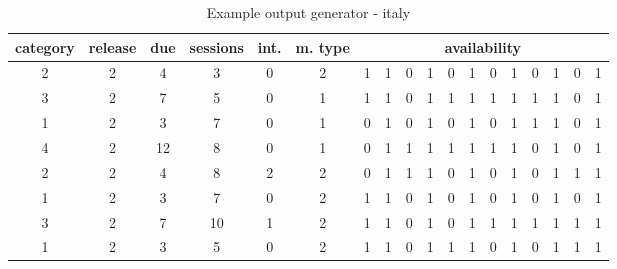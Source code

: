  \begin{table}[h]
\begin{tabular}{|c|c|c|c|c|c|c|c|c|c|c|c|c|c|c|c|c|c|}
\hline
category & release & due & sessions & int. & m. type & \multicolumn{12}{c|}{availability}            \\ \hline
2        & 2       & 4   & 3        & 0    & 2       & 1 & 1 & 0 & 1 & 0 & 1 & 0 & 1 & 0 & 1 & 0 & 1 \\ \hline
3        & 2       & 7   & 5        & 0    & 1       & 1 & 1 & 0 & 1 & 1 & 1 & 1 & 1 & 1 & 1 & 0 & 1 \\ \hline
1        & 2       & 3   & 7        & 0    & 1       & 0 & 1 & 0 & 1 & 0 & 1 & 0 & 1 & 1 & 1 & 0 & 1 \\ \hline
4        & 2       & 12  & 8        & 0    & 1       & 0 & 1 & 1 & 1 & 1 & 1 & 1 & 1 & 0 & 1 & 0 & 1 \\ \hline
2        & 2       & 4   & 8        & 2    & 2       & 0 & 1 & 1 & 1 & 0 & 1 & 0 & 1 & 0 & 1 & 1 & 1 \\ \hline
1        & 2       & 3   & 7        & 0    & 2       & 1 & 1 & 0 & 1 & 0 & 1 & 0 & 1 & 0 & 1 & 0 & 1 \\ \hline
3        & 2       & 7   & 10       & 1    & 2       & 1 & 1 & 0 & 1 & 0 & 1 & 1 & 1 & 1 & 1 & 1 & 1 \\ \hline
1        & 2       & 3   & 5        & 0    & 2       & 1 & 1 & 0 & 1 & 1 & 1 & 0 & 1 & 0 & 1 & 1 & 1 \\ \hline
\end{tabular}
\caption{Example output generator - italy}
\end{table}